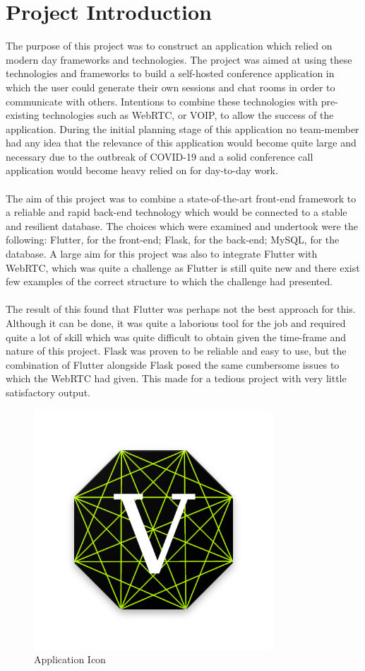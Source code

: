\section{Project Introduction}
The purpose of this project was to construct an application which relied on modern day frameworks and technologies. The project was aimed at using these technologies and frameworks to build a self-hosted conference application in which the user could generate their own sessions and chat rooms in order to communicate with others. Intentions to combine these technologies with pre-existing technologies such as WebRTC, or VOIP, to allow the success of the application. During the initial planning stage of this application no team-member had any idea that the relevance of this application would become quite large and necessary due to the outbreak of COVID-19 and a solid conference call application would become heavy relied on for day-to-day work.
\\\\ The aim of this project was to combine a state-of-the-art front-end framework to a reliable and rapid back-end technology which would be connected to a stable and resilient database. The choices which were examined and undertook were the following: Flutter, for the front-end; Flask, for the back-end; MySQL, for the database. A large aim for this project was also to integrate Flutter with WebRTC, which was quite a challenge as Flutter is still quite new and there exist few examples of the correct structure to which the challenge had presented.
\\\\ The result of this found that Flutter was perhaps not the best approach for this. Although it can be done, it was quite a laborious tool for the job and required quite a lot of skill which was quite difficult to obtain given the time-frame and nature of this project. Flask was proven to be reliable and easy to use, but the combination of Flutter alongside Flask posed the same cumbersome issues to which the WebRTC had given. This made for a tedious project with very little satisfactory output.
\begin{figure}[h!]
    \caption{Application Icon}
    \label{image:vertexChatLogo}
    \centering
    \includegraphics[width=0.8\textwidth]{images/vertexChatLogo.png}
\end{figure}